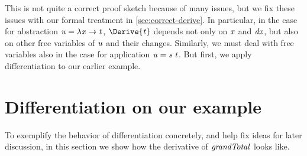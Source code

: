 This is not quite a correct proof sketch because of many issues,
but we fix these issues with our formal treatment in
\cref{sec:correct-derive}. In particular, in the case for
abstraction \ensuremath{\Varid{u}\mathrel{=}\lambda \Varid{x}\to \Varid{t}}, \ensuremath{\Derive{\Varid{t}}} depends not only on \ensuremath{\Varid{x}}
and \ensuremath{\Varid{dx}}, but also on other free variables of \ensuremath{\Varid{u}} and their
changes. Similarly, we must deal with free variables also in the
case for application \ensuremath{\Varid{u}\mathrel{=}\Varid{s}\;\Varid{t}}. But first, we apply
differentiation to our earlier example.

\section{Differentiation on our example}
\label{sec:derive-example}
\label{sec:derive-example-merge}

To exemplify the behavior of differentiation concretely, and help
fix ideas for later discussion, in this section we show how the derivative of
\ensuremath{\Varid{grandTotal}} looks like.

